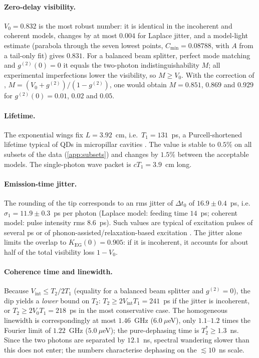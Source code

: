 \documentclass{article}
\newcommand{\Kg}{K_{\mathrm{EG}}}
\newcommand{\Vi}{V_{\mathrm{int}}}
\begin{document}
\paragraph{Zero-delay visibility.} $V_0=0.832$ is the most robust number: it
is identical in the incoherent and coherent models, changes by at most
$0.004$ for Laplace jitter, and a model-light estimate (parabola through the
seven lowest points, $C_{\min}=0.08788$, with $A$ from a tail-only fit)
gives $0.831$. For a balanced beam splitter, perfect mode matching and
$g^{(2)}(0)=0$ it equals the two-photon indistinguishability $M$; all
experimental imperfections lower the visibility, so $M\ge V_0$. With the
correction of \citet{Ollivier2021},
$M=(V_0+g^{(2)})/(1-g^{(2)})$, one would obtain $M=0.851$, $0.869$ and
$0.929$ for $g^{(2)}(0)=0.01$, $0.02$ and $0.05$.

\paragraph{Lifetime.} The exponential wings fix $L=3.92$~cm, i.e.\
$T_1=131$~ps, a Purcell-shortened lifetime typical of QDs in micropillar
cavities \cite{Somaschi2016,Ding2016}. The value is stable to $0.5\%$ on all
subsets of the data (\cref{app:subsets}) and changes by $1.5\%$ between the
acceptable models. The single-photon wave packet is $cT_1=3.9$~cm long.

\paragraph{Emission-time jitter.} The rounding of the tip corresponds to an
rms jitter of $\Delta t_0$ of $16.9\pm0.4$~ps, i.e.\ $\sigma_1=11.9\pm0.3$~ps
per photon (Laplace model: feeding time $14$~ps; coherent model: pulse
intensity rms $8.6$~ps). Such values are typical of excitation pulses of
several ps or of phonon-assisted/relaxation-based excitation
\cite{Unsleber2015,IlesSmith2017}. The jitter alone limits the overlap to
$\Kg(0)=0.905$: if it is incoherent, it accounts for about half of the total
visibility loss $1-V_0$.

\paragraph{Coherence time and linewidth.} Because $\Vi\le T_2/2T_1$ (equality
for a balanced beam splitter and $g^{(2)}=0$), the dip yields a
\emph{lower} bound on $T_2$: $T_2\ge 2\Vi T_1=241$~ps if the jitter is
incoherent, or $T_2\ge 2V_0T_1=218$~ps in the most conservative case. The
homogeneous linewidth is correspondingly at most $1.46$~GHz ($6.0~\mu$eV),
only $1.1$--$1.2$ times the Fourier limit of $1.22$~GHz ($5.0~\mu$eV); the
pure-dephasing time is $T_2^*\ge1.3$~ns. Since the two photons are
separated by $12.1$~ns, spectral wandering slower than this does not enter;
the numbers characterise dephasing on the $\lesssim\!10$~ns scale.
\end{document}
